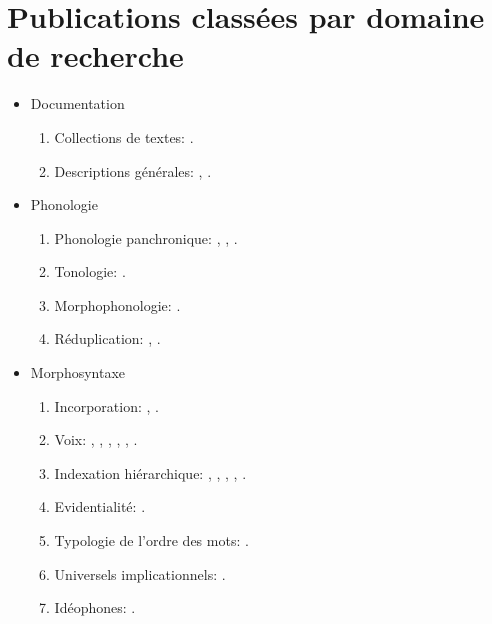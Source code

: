 \documentclass[oldfontcommands,oneside,a4paper,11pt]{article}
\newcommand{\langue}[2]{#2}
\begin{document}
\section{\langue{By topics}{Publications classées par domaine de recherche}}
\begin{itemize}

\item  Documentation
\begin{enumerate}
\item  \langue{Text collections}{Collections de textes}: \citet{jacques10gesar}.
\item \langue{General description}{Descriptions générales}: \citet{jacques04these}, \citet{jacques08}.
\end{enumerate}


\item \langue{Phonology}{Phonologie}
\begin{enumerate}
\item  \langue{Panchronic Phonology}{Phonologie panchronique}:  \citet{jacques11lingua}, \citet{michaud-jacques12nasalite},     \citet{jacques13arapaho}.
\item   \langue{Tonology}{Tonologie}: \citet{jacques11pumi.tone}.
\item \langue{Morphophonology}{Morphophonologie}: \citet{jacques12khaling}.
\item \langue{Reduplication}{Réduplication}:  \citet{jacques04redupl},  \citet{jacques07redupl}.
\end{enumerate}

\item \langue{Morphosyntax}{Morphosyntaxe}
\begin{enumerate}
\item  Incorporation: \citet{jacques11tangut.verb}, \citet{jacques12incorp}.
\item  \langue{Voice}{Voix}:  \citet{jacques07passif}, \citet{jacques10refl}, \citet{jacques12demotion}, \citet{jacques13derivational.khaling}, \citet{jacques13tropative}, \citet{jacques14antipassive}.
\item \langue{Hierarchical agreement}{Indexation hiérarchique}:  \citet{jacques10inverse},     \citet{jacques12khaling},   \citet{antonov14rtau}, \citet{jacques14inverse}, \citet{jacques14rtau}.
\item \langue{Evidentiality}{Evidentialité}: \citet{jacques14auditory}.
\item \langue{Word-order typology}{Typologie de l'ordre des mots}: \citet{jacques13harmonization}.
\item \langue{Implicational universals}{Universels implicationnels}: \citet{antonov14need}.
\item \langue{Ideophones}{Idéophones}: \citet{japhug14ideophones}.
\end{enumerate}


\end{itemize}
\end{document}
